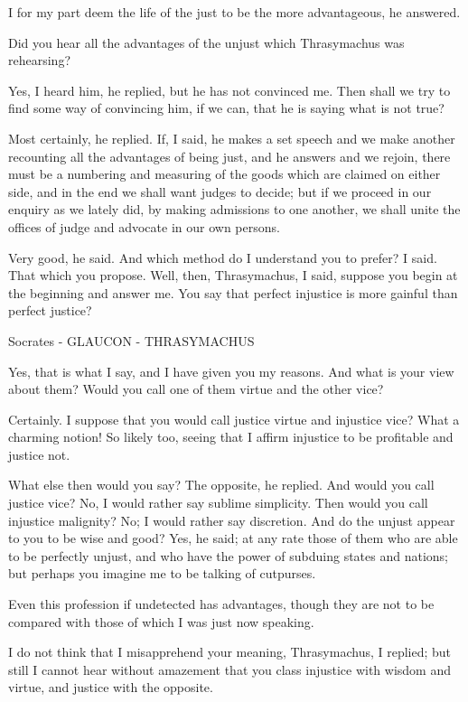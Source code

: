 I for my part deem the life of the just to be the more advantageous, he answered.

Did you hear all the advantages of the unjust which Thrasymachus was rehearsing?

Yes, I heard him, he replied, but he has not convinced me.
Then shall we try to find some way of convincing him, if we can, that he is saying what is not true?

Most certainly, he replied.
If, I said, he makes a set speech and we make another recounting all the advantages of being just, and he answers and we rejoin, there must be a numbering and measuring of the goods which are claimed on either side, and in the end we shall want judges to decide; but if we proceed in our enquiry as we lately did, by making admissions to one another, we shall unite the offices of judge and advocate in our own persons.

Very good, he said.
And which method do I understand you to prefer? I said.
That which you propose.
Well, then, Thrasymachus, I said, suppose you begin at the beginning and answer me. You say that perfect injustice is more gainful than perfect justice?

Socrates - GLAUCON - THRASYMACHUS

Yes, that is what I say, and I have given you my reasons.
And what is your view about them? Would you call one of them virtue and the other vice?

Certainly.
I suppose that you would call justice virtue and injustice vice?
What a charming notion! So likely too, seeing that I affirm injustice to be profitable and justice not.

What else then would you say?
The opposite, he replied.
And would you call justice vice?
No, I would rather say sublime simplicity.
Then would you call injustice malignity?
No; I would rather say discretion.
And do the unjust appear to you to be wise and good?
Yes, he said; at any rate those of them who are able to be perfectly unjust, and who have the power of subduing states and nations; but perhaps you imagine me to be talking of cutpurses.

Even this profession if undetected has advantages, though they are not to be compared with those of which I was just now speaking.

I do not think that I misapprehend your meaning, Thrasymachus, I replied; but still I cannot hear without amazement that you class injustice with wisdom and virtue, and justice with the opposite.

